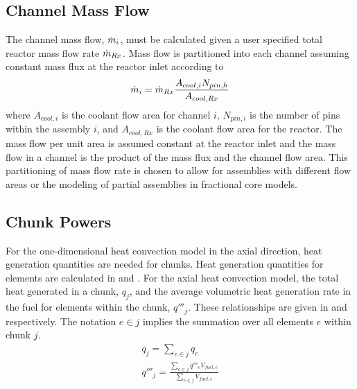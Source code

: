   \subsection{Channel Mass Flow}
    The channel mass flow, $\dot{m}_i$, must be calculated given a user 
    specified total reactor mass flow rate $\dot{m}_{Rx}$.  Mass flow is 
    partitioned into each channel assuming constant mass flux at the reactor 
    inlet according to 
    \begin{equation}
      \label{eq:mass_flow_split}
      \dot{m}_i = \dot{m}_{Rx} \frac{A_{cool,i}N_{pin,h}}{A_{cool,Rx}}
    \end{equation}
    where $A_{cool,i}$ is the coolant flow area for channel $i$, $N_{pin,i}$ is
    the number of pins within the assembly $i$, and $A_{cool,Rx}$
    is the coolant flow area for the reactor.  The mass flow per unit area is 
    assumed constant at the reactor inlet and the mass flow in a channel is the
    product of the mass flux and the channel flow area. This partitioning of
    mass flow rate is chosen to allow for assemblies with different flow areas
    or the modeling of partial assemblies in fractional core models.

  \subsection{Chunk Powers}
    For the one-dimensional heat convection model in the axial direction,
    heat generation quantities are needed for chunks. Heat generation quantities
    for elements are calculated in  and
    .
    For the axial heat convection model, the total heat generated in a chunk,
    $q_j$, and the average volumetric heat generation rate in the fuel for
    elements within the chunk, $q'''_j$. 
    These relationships are given in  and
     respectively. The notation $e \in j$ implies the
    summation over all elements $e$ within chunk $j$.
    \begin{align}
      \label{eq:chunkpwr}
      q_j = \sum_{e \in j} q_e \\
      \label{eq:chunkqppp_fuel}
      q'''_j = \frac{\sum_{e \in j} q'''_e V_{fuel,e}}{\sum_{e \in j} 
        V_{fuel,e}}
    \end{align}
  
